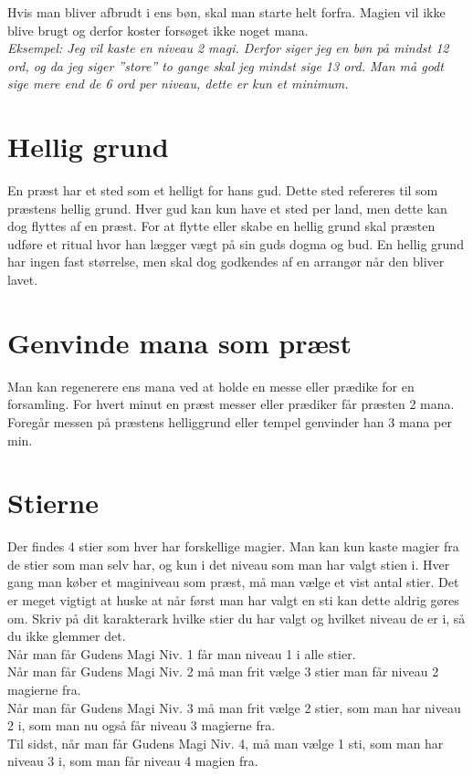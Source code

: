 Hvis man bliver afbrudt i ens bøn, skal man starte helt forfra. Magien vil ikke blive brugt og derfor koster forsøget ikke noget mana.\\
\textit{Eksempel: Jeg vil kaste en niveau 2 magi. Derfor siger jeg en bøn på mindst 12 ord, og da jeg siger ”store” to gange skal jeg mindst sige 13 ord. Man må godt sige mere end de 6 ord per niveau, dette er kun et minimum.}

\section{Hellig grund}
En præst har et sted som et helligt for hans gud. Dette sted refereres til som præstens hellig grund. Hver gud kan kun have et sted per land, men dette kan dog flyttes af en præst. For at flytte eller skabe en hellig grund skal præsten udføre et ritual hvor han lægger vægt på sin guds dogma og bud. En hellig grund har ingen fast størrelse, men skal dog godkendes af en arrangør når den bliver lavet.

\section{Genvinde mana som præst}
Man kan regenerere ens mana ved at holde en messe eller prædike for en forsamling. For hvert minut en præst messer eller prædiker får præsten 2 mana. Foregår messen på præstens helliggrund eller tempel genvinder han 3 mana per min.

\section{Stierne}
Der findes 4 stier som hver har forskellige magier. Man kan kun kaste magier fra de stier som man selv har, og kun i det niveau som man har valgt stien i. Hver gang man køber et maginiveau som præst, må man vælge et vist antal stier. Det er meget vigtigt at huske at når først man har valgt en sti kan dette aldrig gøres om. Skriv på dit karakterark hvilke stier du har valgt og hvilket niveau de er i, så du ikke glemmer det.\\
Når man får Gudens Magi Niv. 1 får man niveau 1 i alle stier. \\
Når man får Gudens Magi Niv. 2 må man frit vælge 3 stier man får niveau 2 magierne fra.\\ 
Når man får Gudens Magi Niv. 3 må man frit vælge 2 stier, som man har niveau 2 i, som man nu også får niveau 3 magierne fra.\\ 
Til sidst, når man får Gudens Magi Niv. 4, må man vælge 1 sti, som man har niveau 3 i, som man får niveau 4 magien fra.







